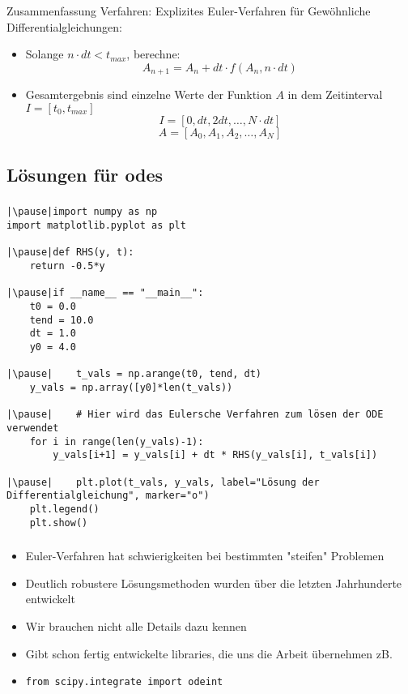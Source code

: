 \begin{frame}
    \frametitle{\insertsubsection}
    Zusammenfassung Verfahren: Explizites Euler-Verfahren für Gewöhnliche Differentialgleichungen:
    \begin{itemize}
        \item Solange $n\cdot dt < t_{max}$, berechne:
        \[A_{n+1} = A_n + dt\cdot f(A_n, n\cdot dt)\]
        \item Gesamtergebnis sind einzelne Werte der Funktion $A$ in dem Zeitinterval $I=[t_0, t_{max}]$
        \[I = [0, dt, 2dt, \dots, N\cdot dt]\]
        \[A = [A_0, A_1, A_2, \dots, A_N]\]
    \end{itemize}
\end{frame}


\subsection{Lösungen für \acsp{ode}}
\label{subsec:solving}
\begin{frame}[fragile]
    \frametitle{\insertsubsection}
    \begin{verbatim}
|\pause|import numpy as np
import matplotlib.pyplot as plt

|\pause|def RHS(y, t):
    return -0.5*y

|\pause|if __name__ == "__main__":
    t0 = 0.0
    tend = 10.0
    dt = 1.0
    y0 = 4.0

|\pause|    t_vals = np.arange(t0, tend, dt)
    y_vals = np.array([y0]*len(t_vals))

|\pause|    # Hier wird das Eulersche Verfahren zum lösen der ODE verwendet
    for i in range(len(y_vals)-1):
        y_vals[i+1] = y_vals[i] + dt * RHS(y_vals[i], t_vals[i])

|\pause|    plt.plot(t_vals, y_vals, label="Lösung der Differentialgleichung", marker="o")
    plt.legend()
    plt.show()
	\end{verbatim}
\end{frame}


\begin{frame}[fragile]
    \frametitle{\insertsubsection}
    \begin{itemize}
        \item Euler-Verfahren hat schwierigkeiten bei bestimmten "steifen" Problemen
        \item Deutlich robustere Lösungsmethoden wurden über die letzten Jahrhunderte entwickelt
        \item Wir brauchen nicht alle Details dazu kennen
        \item Gibt schon fertig entwickelte libraries, die uns die Arbeit übernehmen zB.
        \item[] \begin{verbatim}
from scipy.integrate import odeint
                \end{verbatim}
    \end{itemize}
\end{frame}



